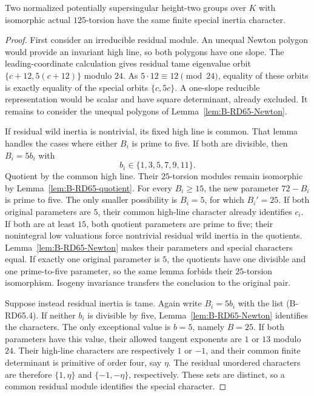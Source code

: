\begin{proposition}
\label{prop:B-RD65-nonsquare}
Two normalized potentially supersingular height-two groups over $K$
with isomorphic actual $125$-torsion have the same finite special
inertia character.
\end{proposition}
\begin{proof}
First consider an irreducible residual module. An unequal Newton
polygon would provide an invariant high line, so both polygons
have one slope. The leading-coordinate calculation gives residual
tame eigenvalue orbit $\{c+12,5(c+12)\}$ modulo $24$.
As $5\cdot12\equiv12\pmod{24}$, equality of these orbits is exactly
equality of the special orbits $\{c,5c\}$.
A one-slope reducible representation would be scalar and have
square determinant, already excluded. It remains to consider the
unequal polygons of Lemma~\ref{lem:B-RD65-Newton}.

If residual wild inertia is nontrivial, its fixed high line is
common. That lemma handles the cases where either $B_i$ is prime
to five. If both are divisible, then $B_i=5b_i$ with
\[
                       b_i\in\{1,3,5,7,9,11\}.        \tag{B-RD65.4}
\]
Quotient by the common high line. Their $25$-torsion modules remain
isomorphic by Lemma~\ref{lem:B-RD65-quotient}.
For every $B_i\ge15$, the new parameter $72-B_i$ is prime to five.
The only smaller possibility is $B_i=5$, for which $B_i'=25$.
If both original parameters are $5$, their common high-line
character already identifies $c_i$. If both are at least $15$,
both quotient parameters are prime to five; their nonintegral low
valuations force nontrivial residual wild inertia in the quotients.
Lemma~\ref{lem:B-RD65-Newton} makes their parameters and special
characters equal. If exactly one original parameter is $5$, the
quotients have one divisible and one prime-to-five parameter, so
the same lemma forbids their $25$-torsion isomorphism.
Isogeny invariance transfers the conclusion to the original pair.

Suppose instead residual inertia is tame. Again write $B_i=5b_i$
with the list (B-RD65.4). If neither $b_i$ is divisible by five,
Lemma~\ref{lem:B-RD65-Newton} identifies the characters.
The only exceptional value is $b=5$, namely $B=25$.
If both parameters have this value, their allowed tangent exponents
are $1$ or $13$ modulo $24$. Their high-line characters are respectively
$1$ or $-1$, and their common finite determinant is primitive of
order four, say $\eta$. The residual unordered characters are
therefore $\{1,\eta\}$ and $\{-1,-\eta\}$, respectively. These sets
are distinct, so a common residual module identifies the special
character.


\end{proof}
